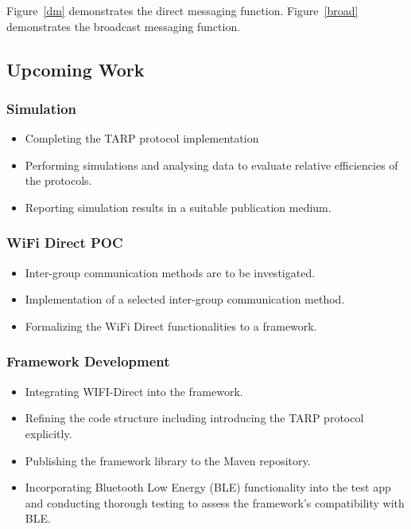 Figure~\ref{dm} demonstrates the direct messaging function.
Figure~\ref{broad} demonstrates the broadcast messaging function.

\newpage

\subsection{Upcoming Work}

\subsubsection{Simulation}
\begin{itemize}
    \item Completing the TARP protocol implementation
    \item Performing simulations and analysing data to evaluate relative
          efficiencies of the protocols.
    \item Reporting simulation results in a suitable publication medium.
\end{itemize}

\vspace{0.3cm}

\subsubsection{WiFi Direct POC}
\begin{itemize}
    \item Inter-group communication methods are to be investigated.
    \item Implementation of a selected inter-group communication method.
    \item Formalizing the WiFi Direct functionalities to a framework.
\end{itemize}

\vspace{0.3cm}

\subsubsection{Framework Development}
\begin{itemize}
    \item Integrating WIFI-Direct into the framework.
    \item Refining the code structure including introducing the TARP protocol
          explicitly.
    \item Publishing the framework library to the Maven repository.
    \item Incorporating Bluetooth Low Energy (BLE) functionality into the test
          app and conducting thorough testing to assess the framework's compatibility
          with BLE.
\end{itemize}
